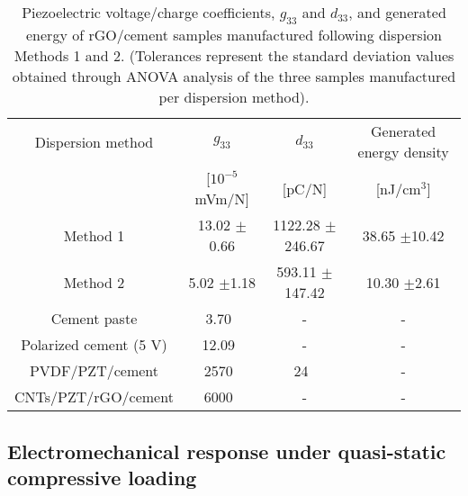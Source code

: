 \documentclass[a4paper,fleqn]{cas-sc}
\begin{document}
\begin{table}[H]	
\setlength{\tabcolsep}{3pt} %
\newcommand\Tstrut{\rule{0pt}{0,3cm}}         %
\newcommand\Bstrut{\rule[-0.15cm]{0pt}{0pt}}   %
\footnotesize					
\caption{Piezoelectric voltage/charge coefficients, $g_{33}$ and $d_{33}$, and generated energy of rGO/cement samples manufactured following dispersion Methods 1 and 2. (Tolerances represent the standard deviation values obtained through ANOVA analysis of the three samples manufactured per dispersion method).}
\vspace{0.1cm}
\centering							
\begin{tabular}{cccc}	
\hline					    
Dispersion method & $g_{33}$           &   $d_{33}$ &  Generated energy density\Tstrut\Bstrut\\
                  &  [$10^{-5}$ mVm/N] &    [pC/N]  & [nJ/$\mathrm{cm^3}$] \Tstrut\Bstrut\\
\hline
         Method 1 & 13.02 $\mathrm{\pm}$0.66 & 1122.28 $\mathrm{\pm}$246.67 & 38.65 $\mathrm{\pm}$10.42 \Tstrut\Bstrut\\
         Method 2 & 5.02 $\mathrm{\pm}$1.18 & 593.11 $\mathrm{\pm}$147.42 & 10.30 $\mathrm{\pm}$2.61  \Tstrut\Bstrut\\
         Cement paste & 3.70~\cite{AlQaralleh2022} & - & -  \Tstrut\Bstrut\\
         Polarized cement (5 V) & 12.09~\cite{AlQaralleh2022} & - & -  \Tstrut\Bstrut\\
         PVDF/PZT/cement & 2570~\cite{Jaitanong2014} & 24~\cite{Jaitanong2014} & -  \Tstrut\Bstrut\\
         CNTs/PZT/rGO/cement & 6000~\cite{Gong2010} & - & -  \Tstrut\Bstrut\\
\hline
\end{tabular}			
\label{piezo_factors}							
\end{table}

\subsection{Electromechanical response under quasi-static compressive loading}\label{Sect22}
\end{document}
